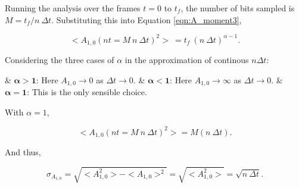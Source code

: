\begin{description}
			Running the analysis over the frames $t = 0$ to $t_f$, the number of bits sampled is $M = {t_f / n\ \Delta t}$. Substituting this into Equation \ref{eqn:A_moment3},

			\begin{equation}
				<A_{1,0}(nt = M\ n\ \Delta t)^2>\ = t_f\ (n\ \Delta t)^{\alpha -1}.
			\end{equation}

			Considering the three cases of $\alpha$ in the approximation of continous $n \Delta t$:
			
			\vspace{1em}

			\begin{easylist}[itemize]
				& $\bm{\alpha > 1}$: Here $A_{1,0} \to 0$ as $\Delta t \to 0$.
				& $\bm{\alpha < 1}$: Here $A_{1,0} \to \infty$ as $\Delta t \to 0$.
				& $\bm{\alpha = 1}$: This is the only sensible choice.
			\end{easylist}
			
			\vspace{1em}

			With $\alpha =1$,

			\begin{equation}
				<A_{1,0}(nt = M\ n\ \Delta t)^2> = M (n\ \Delta t).
			\end{equation}

			And thus,

			\begin{equation}
				\sigma_{A_{1,0}} = \sqrt{<A_{1,0}^2> - <A_{1,0}>^2} = \sqrt{<A_{1,0}^2>} = \sqrt{n\ \Delta t}.
			\end{equation}

	\end{description}	